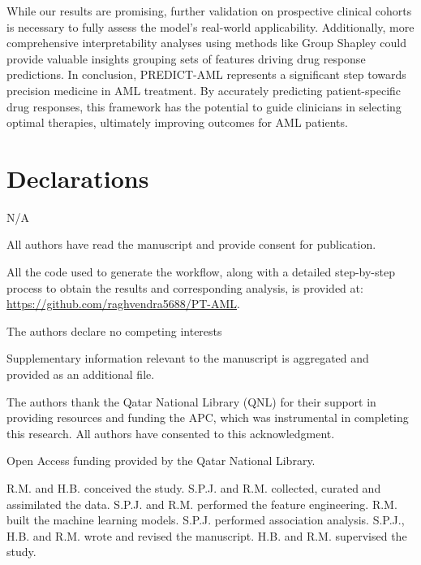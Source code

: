\documentclass[pdflatex,sn-mathphys-num]{sn-jnl}%
\theoremstyle{thmstyleone}%
\theoremstyle{thmstyletwo}%
\theoremstyle{thmstylethree}%
\begin{document}
While our results are promising, further validation on prospective clinical cohorts is necessary to fully assess the model's real-world applicability. Additionally, more comprehensive interpretability analyses using methods like Group Shapley \cite{jullum2021groupshapley} could provide valuable insights grouping sets of features driving drug response predictions. In conclusion, PREDICT-AML represents a significant step towards precision medicine in AML treatment. By accurately predicting patient-specific drug responses, this framework has the potential to guide clinicians in selecting optimal therapies, ultimately improving outcomes for AML patients.

\section*{Declarations}
N/A

All authors have read the manuscript and provide consent for publication.

All the code used to generate the workflow, along with a detailed step-by-step process to obtain the results and corresponding analysis, is provided at: \url{https://github.com/raghvendra5688/PT-AML}.

The authors declare no competing interests

Supplementary information relevant to the manuscript is aggregated and provided as an additional file.

The authors thank the Qatar National Library (QNL) for their support in providing resources and funding the APC, which was instrumental in completing this research. All authors have consented to this acknowledgment.

Open Access funding provided by the Qatar National Library.

R.M. and H.B. conceived the study. S.P.J. and R.M. collected, curated and assimilated the data. S.P.J. and R.M. performed the feature engineering. R.M. built the machine learning models. S.P.J. performed association analysis. S.P.J., H.B. and R.M. wrote and revised the manuscript. H.B. and R.M. supervised the study.
% 

\end{document}
